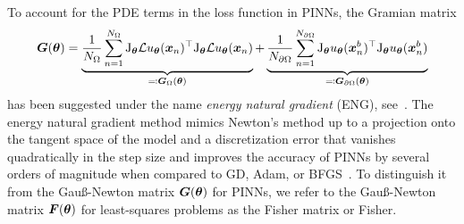 To account for the PDE terms in the loss function in PINNs,
the Gramian matrix
\begin{equation}\label{eq:gramian}
  \mG(\vtheta) = %
  \underbrace{\frac1{{N_\Omega}} \sum_{n=1}^{N_\Omega} \jac_{\vtheta} \mathcal{L} u_\vtheta(\vx_n)^\top \jac_{\vtheta} \mathcal{L} u_\vtheta(\vx_n)}_{\eqqcolon \mG_\Omega(\vtheta)} + \underbrace{\frac1{{N_{\partial\Omega}}} \sum_{n=1}^{N_{\partial\Omega}} \jac_{\vtheta} u_\vtheta(\vx_n^b)^\top \jac_{\vtheta} u_\vtheta (\vx_n^b)}_{\eqqcolon \mG_{\partial\Omega}(\vtheta)}
\end{equation}
has been suggested under the name \emph{energy natural gradient} (ENG), see~\cite{muller2023achieving}.
The energy natural gradient method mimics Newton's method up to a projection onto the tangent space of the model and a discretization error that vanishes quadratically in the step size
and improves the accuracy of PINNs by several orders of magnitude when compared to GD, Adam, or BFGS~\citep{muller2023achieving, ?}.
To distinguish it from the Gauß-Newton matrix ${\bm{G}}({\bm{\theta}})$ for PINNs, we refer to the Gauß-Newton matrix ${\bm{F}}({\bm{\theta}})$ for least-squares problems as the Fisher matrix or Fisher. 

